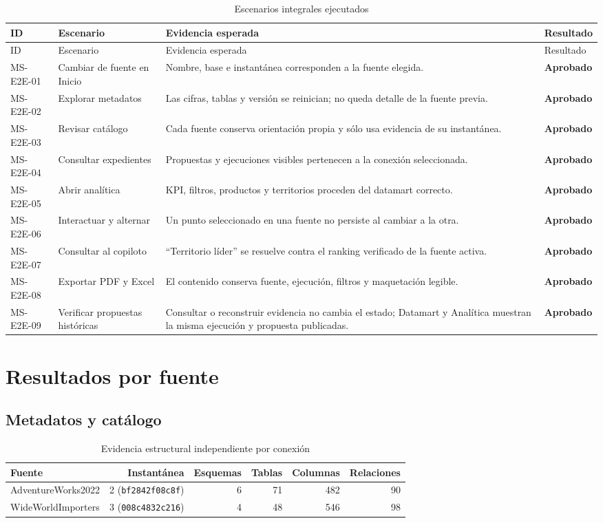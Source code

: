 \documentclass[11pt,letterpaper]{article}
\newcommand{\file}[1]{\texttt{#1}}
\newcommand{\ok}{\textcolor{success}{\textbf{Aprobado}}}
\begin{document}
\begin{longtable}{@{}p{}p{}p{}p{}@{}}
\caption{Escenarios integrales ejecutados}\label{tab:escenarios}\\
\toprule
ID & Escenario & Evidencia esperada & Resultado \\
\midrule
\endfirsthead
\toprule
ID & Escenario & Evidencia esperada & Resultado \\
\midrule
\endhead
MS-E2E-01 & Cambiar de fuente en Inicio & Nombre, base e instantánea corresponden a la fuente elegida. & \ok \\
MS-E2E-02 & Explorar metadatos & Las cifras, tablas y versión se reinician; no queda detalle de la fuente previa. & \ok \\
MS-E2E-03 & Revisar catálogo & Cada fuente conserva orientación propia y sólo usa evidencia de su instantánea. & \ok \\
MS-E2E-04 & Consultar expedientes & Propuestas y ejecuciones visibles pertenecen a la conexión seleccionada. & \ok \\
MS-E2E-05 & Abrir analítica & KPI, filtros, productos y territorios proceden del datamart correcto. & \ok \\
MS-E2E-06 & Interactuar y alternar & Un punto seleccionado en una fuente no persiste al cambiar a la otra. & \ok \\
MS-E2E-07 & Consultar al copiloto & ``Territorio líder'' se resuelve contra el ranking verificado de la fuente activa. & \ok \\
MS-E2E-08 & Exportar PDF y Excel & El contenido conserva fuente, ejecución, filtros y maquetación legible. & \ok \\
MS-E2E-09 & Verificar propuestas históricas & Consultar o reconstruir evidencia no cambia el estado; Datamart y Analítica muestran la misma ejecución y propuesta publicadas. & \ok \\
\bottomrule
\end{longtable}

\section{Resultados por fuente}

\subsection{Metadatos y catálogo}

\begin{table}[H]
\centering
\caption{Evidencia estructural independiente por conexión}
\begin{tabularx}{\textwidth}{@{}Xrrrrr@{}}
\toprule
Fuente & Instantánea & Esquemas & Tablas & Columnas & Relaciones \\
\midrule
AdventureWorks2022 & 2 (\file{bf2842f08c8f}) & 6 & 71 & 482 & 90 \\
WideWorldImporters & 3 (\file{008c4832c216}) & 4 & 48 & 546 & 98 \\
\bottomrule
\end{tabularx}
\end{table}
\end{document}
